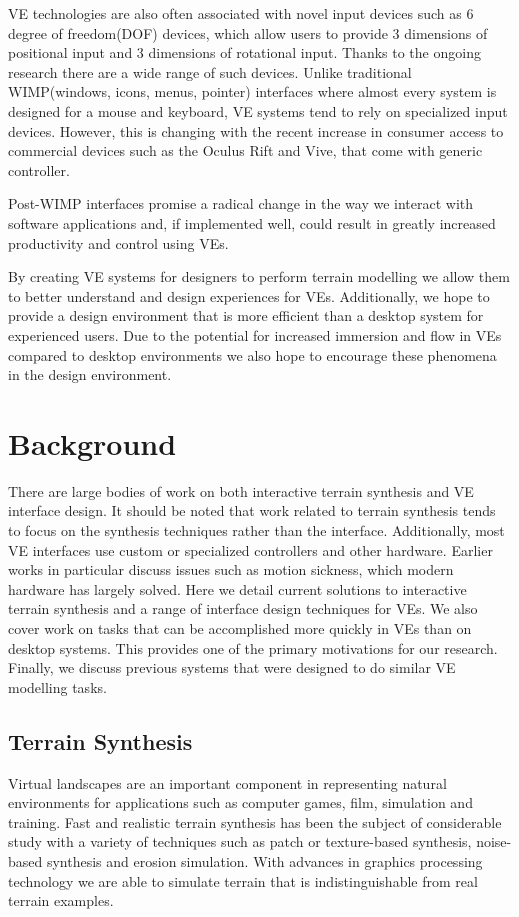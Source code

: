 \documentclass{sig-alternate-05-2015}
\begin{document}
VE technologies are also often associated with novel input devices such as 6 degree of freedom(DOF) devices, which allow users to provide 3 dimensions of positional input and 3 dimensions of rotational input. Thanks to the ongoing research there are a wide range of such devices. Unlike traditional WIMP(windows, icons, menus, pointer) interfaces where almost every system is designed for a mouse and keyboard, VE systems tend to rely on specialized input devices\cite{Hand1997,Bowman2001}. However, this is changing with the recent increase in consumer access to commercial devices such as the Oculus Rift and Vive, that come with generic controller.

Post-WIMP interfaces promise a radical change in the way we interact with software applications and, if implemented well, could result in greatly increased productivity and control using VEs.
 
By creating VE systems for designers to perform terrain modelling we allow them to better understand and design experiences for VEs. Additionally, we hope to provide a design environment that is more efficient than a desktop system for experienced users. Due to the potential for increased immersion and flow in VEs compared to desktop environments\cite{Schubert2001} we also hope to encourage these phenomena in the design environment.
\section{Background}
There are large bodies of work on both interactive terrain synthesis and VE interface design. It should be noted that work related to terrain synthesis tends to focus on the synthesis techniques rather than the interface. Additionally, most VE interfaces use custom or specialized controllers and other hardware. Earlier works in particular discuss issues such as motion sickness, which modern hardware has largely solved. Here we detail current solutions to interactive terrain synthesis and a range of interface design techniques for VEs. We also cover work on tasks that can be accomplished more quickly in VEs than on desktop systems. This provides one of the primary motivations for our research. Finally, we discuss previous systems that were designed to do similar VE modelling tasks. 
\subsection{Terrain Synthesis} 
Virtual landscapes are an important component in representing natural environments for applications such as computer games, film, simulation and training\cite{Gain2015}. Fast and realistic terrain synthesis has been the subject of considerable study with a variety of techniques such as patch or texture-based synthesis\cite{Cruz2015, Tasse2012}, noise-based synthesis\cite{Musgrave1989} and erosion simulation\cite{Anh2007}. With advances in graphics processing technology we are able to simulate terrain that is indistinguishable from real terrain examples\cite{Gain2015}. 
\end{document}
